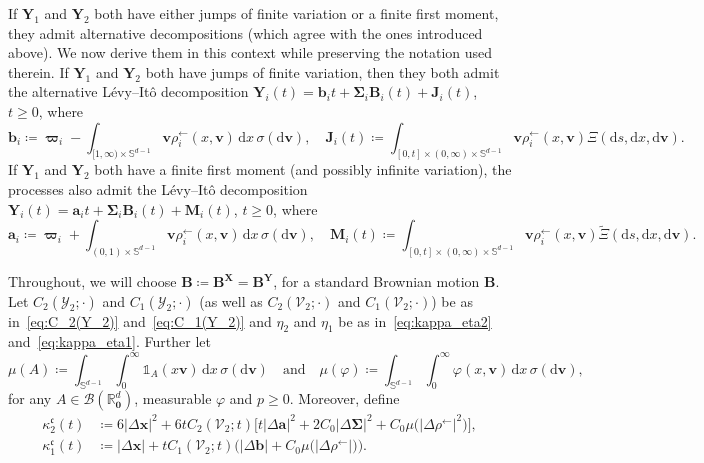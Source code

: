 \documentclass[en,oneside,bbfont,article]{amsart}
\theoremstyle{remark}
\theoremstyle{definition}
\theoremstyle{definition}
\newcommand\Y{\bm{\mathcal{Y}}}
\newcommand{\V}{\bm{\mathcal{V}}}
\newcommand\Sp{\mathbb{S}}
\newcommand\R{\mathbb{R}}
\newcommand\1{\mathds{1}}
\newcommand{\Borel}{\mathcal{B}}
\newcommand\la{\leftarrow}
\renewcommand\ge{\geqslant}
\newcommand{\D}{\mathrm{d}}
\newcommand{\wt}[1]{\widetilde{#1}}
\newcommand{\mfc}{{\mathfrak{c}}}
\begin{document}
If $\bm{Y}_1$ and $\bm{Y}_2$ both have either jumps of finite variation or a finite first moment, they admit alternative decompositions (which agree with the ones introduced above). We now derive them in this context while preserving the notation used therein. If $\bm{Y}_1$ and $\bm{Y}_2$ both have jumps of finite variation, then they both admit the alternative L\'evy--It\^o decomposition $\bm{Y}_i(t)=\bm{b}_{i} t+\bm{\Sigma}_{i}\bm{B}_{i}(t)+\bm{J}_{i}(t)$, $t\ge 0$, where
\begin{equation}
\label{eq:thinning_coupling_FV_CM}
\bm{b}_i
\coloneqq\bm{\varpi}_i-\int_{[1,\infty)\times \Sp^{d-1}}
\!\!\bm{v}\rho_{i}^{\la}(x,\bm{v})\,\D x\, \sigma(\D \bm{v}),
\quad
\bm{J}_i(t)
\coloneqq \int_{[0,t]\times (0,\infty)\times \Sp^{d-1}}\bm{v}\rho_{i}^{\la}(x,\bm{v}) \Xi(\D s, \D x, \D \bm{v}).
\end{equation}
If $\bm{Y}_1$ and $\bm{Y}_2$ both have a finite first moment (and possibly infinite variation), the processes also admit the L\'evy--It\^o decomposition $\bm{Y}_i(t)=\bm{a}_i t + \bm\Sigma_i\bm{B}_i(t) + \bm{M}_i(t)$, $t \ge 0$, where
\begin{equation}
\label{eq:thinning_coupling_FM_CM}
\bm{a}_i
\coloneqq\bm{\varpi}_i+\int_{(0,1)\times \Sp^{d-1}}
\bm{v}\rho_{i}^{\la}(x,\bm{v})\,\D x \,\sigma(\D \bm{v}),
\quad
\bm{M}_i(t)
\coloneqq \int_{[0,t]\times (0,\infty)\times \Sp^{d-1}}
\!\!\bm{v}\rho_{i}^{\la}(x,\bm{v})\wt \Xi(\D s, \D x, \D \bm{v}).
\end{equation}

Throughout, we will choose $\bm{B}\coloneqq \bm{B}^{\bm{X}}=\bm{B}^{\bm{Y}}$, for a standard Brownian motion $\bm{B}$. Let $C_2(\Y_2;\cdot)$ and $C_1(\Y_2;\cdot)$ (as well as $C_2(\V_2;\cdot)$ and $C_1(\V_2;\cdot)$) be as in~\eqref{eq:C_2(Y_2)} and~\eqref{eq:C_1(Y_2)} and $\eta_2$ and $\eta_1$ be as in~\eqref{eq:kappa_eta2} and~\eqref{eq:kappa_eta1}. Further let 
\[
\mu(A)
\coloneqq\int_{\Sp^{d-1}}\int_0^\infty \1_A(x\bm{v})\,\D x\,\sigma(\D\bm{v})
\quad\text{and}\quad
\mu(\varphi)
\coloneqq\int_{\Sp^{d-1}}\int_0^\infty \varphi(x,\bm{v})\,\D x\,\sigma(\D\bm{v}),
\]
for any $A\in\Borel(\R^d_{\bm 0})$, measurable $\varphi$ and $p\ge 0$. Moreover, define
\begin{align}\label{eq:defn_kappa_2_cm}
\kappa^\mfc_2(t)
&\coloneqq 6|\Delta\bm{x}|^2
+ 6 t C_2(\V_2;t) \big[t|\Delta\bm{a}|^2 
+ 2 C_0 |\Delta\bm\Sigma|^2
+ C_0 \mu\big(|\Delta\rho^\la|^2\big)\big],\\
\label{eq:defn_kappa_1_cm}
\kappa^\mfc_1(t)
&\coloneqq |\Delta\bm{x}|
+ t C_1(\V_2;t) \big(|\Delta\bm{b}| 
+ C_0\mu\big(|\Delta\rho^{\la}|\big)\big).
\end{align}
\end{document}
